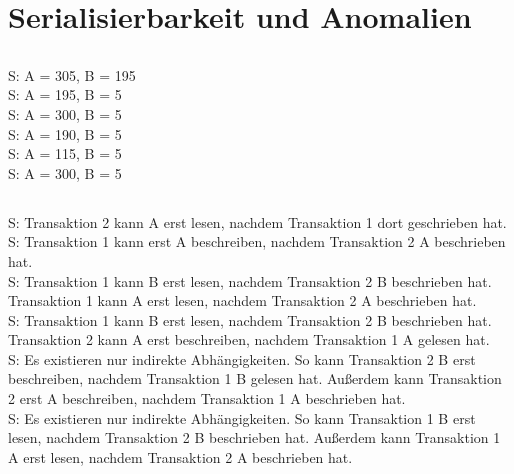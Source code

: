 \documentclass[ngerman]{gdb-aufgabenblatt}
\begin{document}
\section{Serialisierbarkeit und Anomalien}
	\subsection{} %
		S: A = 305, B = 195 \\
		S: A = 195, B = 5 \\
		S: A = 300, B = 5 \\
		S: A = 190, B = 5 \\
		S: A = 115, B = 5 \\
		S: A = 300, B = 5
	\subsection{} %
		S: Transaktion 2 kann A erst lesen, nachdem Transaktion 1 dort geschrieben hat. \\
		S: Transaktion 1 kann erst A beschreiben, nachdem Transaktion 2 A beschrieben hat. \\
		S: Transaktion 1 kann B erst lesen, nachdem Transaktion 2 B beschrieben hat. Transaktion 1 kann A erst lesen, nachdem Transaktion 2 A beschrieben hat. \\
		S: Transaktion 1 kann B erst lesen, nachdem Transaktion 2 B beschrieben hat. Transaktion 2 kann A erst beschreiben, nachdem Transaktion 1 A gelesen hat. \\
		S: Es existieren nur indirekte Abhängigkeiten. So kann Transaktion 2 B erst beschreiben, nachdem Transaktion 1 B gelesen hat. Außerdem kann Transaktion 2 erst A beschreiben, nachdem Transaktion 1 A beschrieben hat. \\
		S: Es existieren nur indirekte Abhängigkeiten. So kann Transaktion 1 B erst lesen, nachdem Transaktion 2 B beschrieben hat. Außerdem kann Transaktion 1 A erst lesen, nachdem Transaktion 2 A beschrieben hat.
\end{document}
